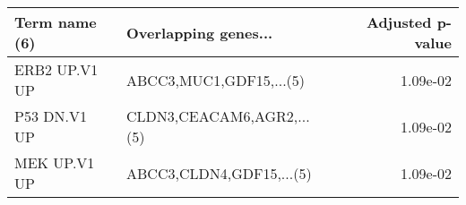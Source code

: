 \begin{tabular}{llr}
\toprule
Term name (6) &      Overlapping genes... &  Adjusted p-value \\
\midrule
ERB2 UP.V1 UP &   ABCC3,MUC1,GDF15,...(5) &          1.09e-02 \\
 P53 DN.V1 UP & CLDN3,CEACAM6,AGR2,...(5) &          1.09e-02 \\
 MEK UP.V1 UP &  ABCC3,CLDN4,GDF15,...(5) &          1.09e-02 \\
\bottomrule
\end{tabular}
